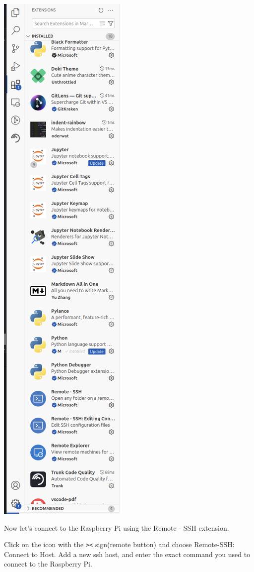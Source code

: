 \documentclass{article}
\begin{document}
\includegraphics[scale=0.2]{img/vsc_exts.png}

Now let's connect to the Raspberry Pi using the Remote - SSH extension.

Click on the icon with the \texttt{><} sign(remote button) and choose Remote-SSH: Connect to Host.
Add a new ssh host, and enter the exact command you used to connect to the Raspberry Pi.
\end{document}
